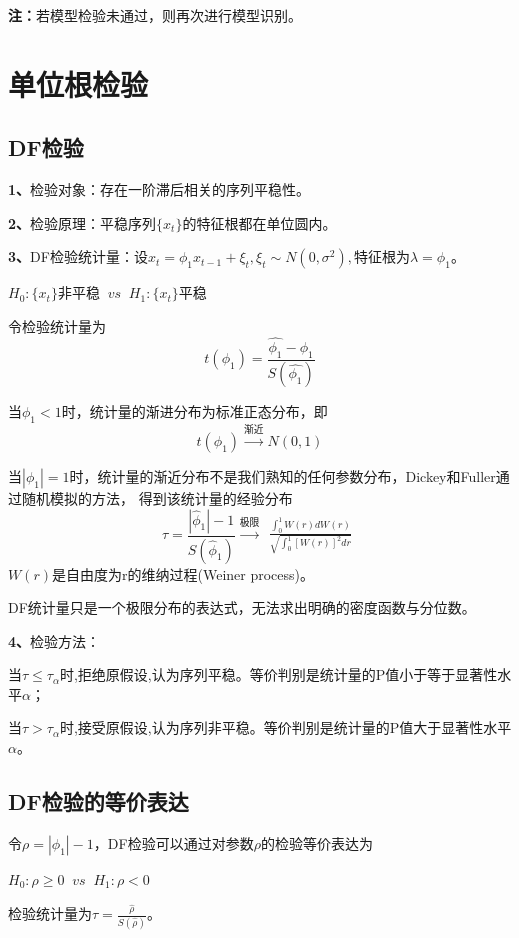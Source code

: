 \documentclass[12pt, a4paper, oneside]{ctexbook}
\begin{document}
\textbf{注：}若模型检验未通过，则再次进行模型识别。

\section{单位根检验}
\subsection{DF检验}
\textbf{1、}检验对象：存在一阶滞后相关的序列平稳性。

\textbf{2、}检验原理：平稳序列$\{x_t\}$的特征根都在单位圆内。

\textbf{3、}DF检验统计量：设$x_t=\phi_1x_{t-1}+\xi_t,\xi_t \sim N(0,\sigma^2)
    ,\text{特征根为}\lambda = \phi_1$。
\begin{center}
    $H_0:\{x_t\}$非平稳 $~vs~$ $H_1:\{x_t\}$平稳
\end{center}
令检验统计量为
\begin{equation}
    t(\phi_1) =\frac{\hat{\phi_1} - \phi_1}{S(\hat{\phi_1})}
\end{equation}

当$\phi_1 < 1$时，统计量的渐进分布为标准正态分布，即
\begin{equation}
    t(\phi_1)\overset{\text{渐近}}{ \operatorname* { \to }}N(0,1)
\end{equation}

当$|\phi_1| = 1$时，统计量的渐近分布不是我们熟知的任何参数分布，Dickey和Fuller通过随机模拟的方法，
得到该统计量的经验分布
\begin{equation}
    \tau=\frac{\left|\hat{\phi}_1\right|-1}{S(\hat{\phi}_1)}
    \overset{\text{极限}}{ \operatorname* { \to }}
    \begin{aligned}
        \frac{\int_0^1W(r)dW(r)}{\sqrt{\int_0^1[W(r)]^2dr}}
    \end{aligned}
\end{equation}
$W(r)$是自由度为r的维纳过程(Weiner process)。

DF统计量只是一个极限分布的表达式，无法求出明确的密度函数与分位数。

\textbf{4、}检验方法：

当$\tau\leq\tau_\alpha$时,拒绝原假设,认为序列平稳。等价判别是统计量的P值小于等于显著性水平$\alpha$；

当$\tau>\tau_{\alpha}$时,接受原假设,认为序列非平稳。等价判别是统计量的P值大于显著性水平$\alpha$。

\subsection{DF检验的等价表达}
令$\rho = |\phi_1|-1$，DF检验可以通过对参数$\rho$的检验等价表达为
\begin{center}
    $H_0:\rho \geq 0$ $~vs~$ $H_1:\rho < 0$
\end{center}
检验统计量为$\tau=\frac{\hat{\rho}}{S(\hat{\rho})}$。
\end{document}
